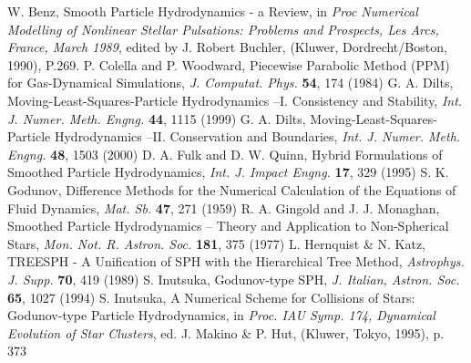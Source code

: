 \documentclass{cjour}
\begin{document}
\begin{article}
\begin{references}
 W. Benz, 
                    Smooth Particle Hydrodynamics - a Review, 
                 in {\it Proc 
                         Numerical Modelling of Nonlinear Stellar 
                         Pulsations: Problems and Prospects, 
                         Les Arcs, France, March 1989},  
                 edited by J. Robert Buchler,  
                 (Kluwer, Dordrecht/Boston, 1990), 
                  P.269.  
 P. Colella and P. Woodward, 
                 Piecewise Parabolic Method (PPM) 
                 for Gas-Dynamical Simulations, 
                {\it J. Computat. Phys.} {\bf 54}, 174 (1984)   
 G. A. Dilts, 
                 Moving-Least-Squares-Particle Hydrodynamics
                 --I. Consistency and Stability, 
                {\it Int. J. Numer. Meth. Engng.} {\bf 44}, 1115 (1999)
 G. A. Dilts, 
                 Moving-Least-Squares-Particle Hydrodynamics
                 --II. Conservation and Boundaries, 
                {\it Int. J. Numer. Meth. Engng.} {\bf 48}, 1503 (2000)
 D. A. Fulk and D. W. Quinn, 
                Hybrid Formulations of Smoothed Particle Hydrodynamics, 
                {\it Int. J. Impact Engng.} {\bf 17}, 329 (1995) 
 S. K. Godunov, 
                 Difference Methods for the Numerical Calculation 
                 of the Equations of Fluid Dynamics, 
                {\it Mat. Sb.} {\bf 47}, 271 (1959)
 R. A. Gingold and J. J. Monaghan, 
                 Smoothed Particle Hydrodynamics 
                 -- Theory and Application to Non-Spherical Stars, 
                 {\it Mon. Not. R. Astron. Soc.} {\bf 181}, 375 (1977) 
 L. Hernquist \& N. Katz, 
              TREESPH - A Unification of SPH with 
              the Hierarchical Tree Method, 
              {\it Astrophys. J. Supp.} {\bf 70}, 419 (1989) 
 S. Inutsuka, 
              Godunov-type SPH, 
              {\it J. Italian, Astron. Soc.} {\bf 65}, 1027 (1994) 
 S. Inutsuka, 
              A Numerical Scheme for Collisions of Stars: 
              Godunov-type Particle Hydrodynamics, 
                   in {\it Proc. IAU Symp. 174, 
                   Dynamical Evolution of Star Clusters},  
                   ed. J. Makino \& P. Hut,
                   (Kluwer, Tokyo, 1995), p. 373 

\end{references}
\end{article}
\end{document}
